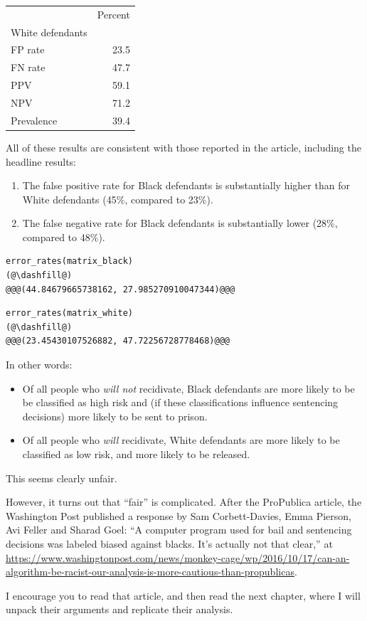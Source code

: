 \begin{tabular}{lr}
\midrule
{} &  Percent \\
White defendants &          \\
\midrule
FP rate          &     23.5 \\
FN rate          &     47.7 \\
PPV              &     59.1 \\
NPV              &     71.2 \\
Prevalence       &     39.4 \\
\midrule
\end{tabular}

All of these results are consistent with those reported in the article,
including the headline results:

\begin{enumerate}
\def\labelenumi{\arabic{enumi}.}
\item
  The false positive rate for Black defendants is substantially higher
  than for White defendants (45\%, compared to 23\%).
\item
  The false negative rate for Black defendants is substantially lower
  (28\%, compared to 48\%).
\end{enumerate}

\begin{lstlisting}[]
error_rates(matrix_black)
(@\dashfill@)
@@@(44.84679665738162, 27.985270910047344)@@@
\end{lstlisting}

\begin{lstlisting}[]
error_rates(matrix_white)
(@\dashfill@)
@@@(23.45430107526882, 47.72256728778468)@@@
\end{lstlisting}

In other words:

\begin{itemize}
\item
  Of all people who \emph{will not} recidivate, Black defendants are
  more likely to be be classified as high risk and (if these
  classifications influence sentencing decisions) more likely to be sent
  to prison.
\item
  Of all people who \emph{will} recidivate, White defendants are more
  likely to be classified as low risk, and more likely to be released.
\end{itemize}

This seems clearly unfair.

However, it turns out that ``fair'' is complicated. After the ProPublica
article, the Washington Post published a response by Sam Corbett-Davies,
Emma Pierson, Avi Feller and Sharad Goel: ``A computer program used for
bail and sentencing decisions was labeled biased against blacks. It's
actually not that clear,'' at
\url{https://www.washingtonpost.com/news/monkey-cage/wp/2016/10/17/can-an-algorithm-be-racist-our-analysis-is-more-cautious-than-propublicas}.

I encourage you to read that article, and then read the next chapter,
where I will unpack their arguments and replicate their analysis.

